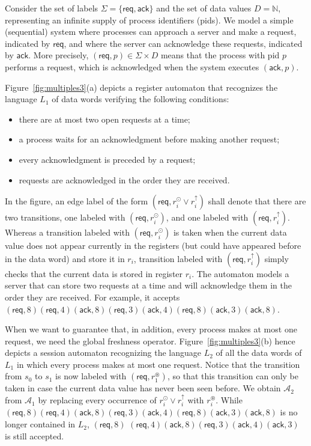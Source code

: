 \documentclass{LMCS}
\def\N{\ensuremath{\mathbb N}\xspace}
\newcommand{\Data}{D}
\def\A{\mathcal A}
\newcommand{\rreg}[1]{#1^\uparrow}
\newcommand{\lfresh}[1]{#1^\odot}
\newcommand{\gfresh}[1]{#1^\circledast}
\newcommand{\ack}{\mathsf{ack}}
\newcommand{\req}{\mathsf{req}}
\def\figurename{Figure}
\begin{document}
\begin{exa}\label{ex:req-ack}
  Consider the set of labels $\Sigma = \{\req,\ack\}$ and the set of
  data values $\Data = \N$, representing an infinite supply of process
  identifiers (pids). We model a simple (sequential) system where
  processes can approach a server and make a request, indicated by
  $\req$, and where the server can acknowledge these requests,
  indicated by $\ack$. More precisely, $(\req,p) \in \Sigma \times
  \Data$ means that the process with pid $p$ performs a request, which is
  acknowledged when the system executes $(\ack,p)$.

  \figurename~\ref{fig:multiples3}(a) depicts a register
  automaton that recognizes the language $L_1$ of data words verifying
  the following conditions:
  \begin{itemize}
  \item there are at most two open requests at a time;
  \item a process waits for an acknowledgment before making another request;
  \item every acknowledgment is preceded by a request;
  \item requests are acknowledged in the order they are received.
  \end{itemize}
  In the figure, an edge label of the form $(\req,\lfresh{r_i} \vee
  \rreg{r_i})$ shall denote that there are two transitions, one
  labeled with $(\req,\lfresh{r_i})$, and one labeled with
  $(\req,\rreg{r_i})$. Whereas a transition labeled with
  $(\req,\lfresh{r_i})$ is taken when the current data value does not
  appear currently in the registers (but could have appeared before in
  the data word) and store it in $r_i$, transition labeled with
  $(\req,\rreg{r_i})$ simply checks that the current data is stored in
  register $r_i$. The automaton models a server that can store two
  requests at a time and will acknowledge them in the order they are
  received. For example, it accepts
  $(\req,8)(\req,4)(\ack,8)(\req,3)(\ack,4)(\req,8)(\ack,3)(\ack,8)$.

  When we want to guarantee that, in addition, every process makes at most one request, we
  need the global freshness
  operator. \figurename~\ref{fig:multiples3}(b)
  hence depicts a session automaton recognizing the language $L_2$ of
  all the data words of $L_1$ in which every process makes at most one
  request. Notice that the transition from $s_0$ to $s_1$ is now
  labeled with $(\req,\gfresh{r_1})$, so that this transition can only
  be taken in case the current data value has never been seen
  before. We obtain $\A_2$ from $\A_1$ by replacing every occurrence
  of $\lfresh{r_i}\lor \rreg{r_i}$ with $\gfresh{r_i}$. While
  $(\req,8)(\req,4)(\ack,8)(\req,3)(\ack,4)(\req,8)(\ack,3)(\ack,8)$
  is no longer contained in $L_2$, $(\req,8)$
  $(\req,4)(\ack,8)(\req,3)(\ack,4)(\ack,3)$ is still accepted.


\end{exa}
\end{document}

